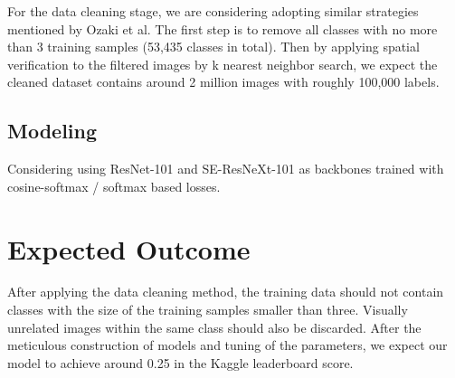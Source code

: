 \documentclass[10pt,twocolumn,letterpaper]{article}
\begin{document}
For the data cleaning stage, we are considering adopting similar strategies mentioned by Ozaki et al. The first step is to remove all classes with no more than 3 training samples (53,435 classes in total). Then by applying spatial verification to the filtered images by k nearest neighbor search, we expect the cleaned dataset contains around 2 million images with roughly 100,000 labels.

\subsection{Modeling}
Considering using ResNet-101 and SE-ResNeXt-101 as backbones trained with cosine-softmax / softmax based losses.


%
%
%

\section{Expected Outcome}
After applying the data cleaning method, the training data should not contain classes with the size of the training samples smaller than three. Visually unrelated images within the same class should also be discarded. After the meticulous construction of models and tuning of the parameters, we expect our model to achieve around 0.25 in the Kaggle leaderboard score.  

\begin{thebibliography}{9}

 
% 
\end{thebibliography}
\end{document}
